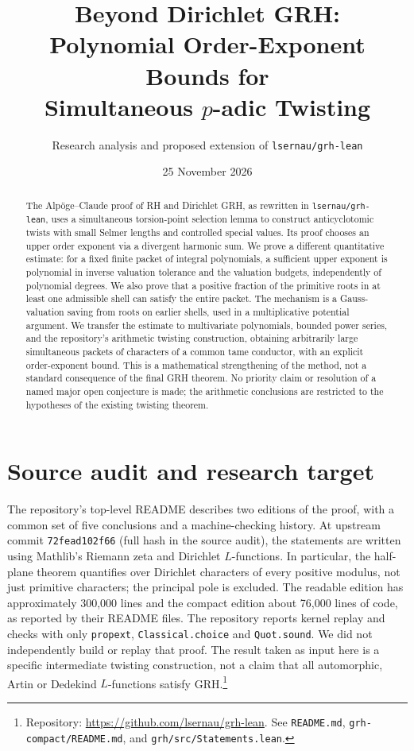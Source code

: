 \documentclass[11pt]{article}
\title{\color{ink}\bfseries Beyond Dirichlet GRH:\\ Polynomial Order-Exponent Bounds for\\ Simultaneous \(p\)-adic Twisting}
\author{Research analysis and proposed extension of \texttt{lsernau/grh-lean}}
\date{25 November 2026}
\theoremstyle{remark}\newtheorem{remark}[theorem]{Remark}
\begin{document}
\maketitle
\begin{abstract}
The Alp\"oge--Claude proof of RH and Dirichlet GRH, as rewritten in
\texttt{lsernau/grh-lean}, uses a simultaneous torsion-point selection
lemma to construct anticyclotomic twists with small Selmer lengths and
controlled special values. Its proof chooses an upper order exponent via
a divergent harmonic sum. We prove a different quantitative estimate:
for a fixed finite packet of integral polynomials, a sufficient upper
exponent is polynomial in inverse valuation tolerance and the valuation
budgets, independently of polynomial degrees. We also prove that a
positive fraction of the primitive roots in at least one admissible shell
can satisfy the entire packet. The mechanism is a Gauss-valuation saving
from roots on earlier shells, used in a multiplicative potential argument.
We transfer the estimate to multivariate polynomials, bounded power
series, and the repository's arithmetic twisting construction, obtaining
arbitrarily large simultaneous packets of characters of a common tame
conductor, with an explicit order-exponent bound. This is a mathematical
strengthening of the method, not a standard consequence of the final GRH
theorem. No priority claim or resolution of a named major open conjecture
is made; the arithmetic conclusions are restricted to the hypotheses of
the existing twisting theorem.
\end{abstract}
\tableofcontents
\newpage
\section{Source audit and research target}

The repository's top-level README describes two editions of the proof,
with a common set of five conclusions and a machine-checking history. At
upstream commit \texttt{72fead102f66} (full hash in the source audit), the
statements are written using Mathlib's Riemann zeta and Dirichlet
$L$-functions. In particular, the half-plane theorem quantifies over
Dirichlet characters of every positive modulus, not just primitive
characters; the principal pole is excluded. The readable edition has
approximately 300,000 lines and the compact edition about 76,000 lines
of code, as reported by their README files. The repository reports kernel
replay and checks with only \texttt{propext}, \texttt{Classical.choice}
and \texttt{Quot.sound}. We did not independently build or replay that
proof. The result taken as input here is a specific intermediate twisting
construction, not a claim that all automorphic, Artin or Dedekind
$L$-functions satisfy GRH.\footnote{Repository: \url{https://github.com/lsernau/grh-lean}. See
\texttt{README.md}, \texttt{grh-compact/README.md}, and
\texttt{grh/src/Statements.lean}.}
\end{document}
